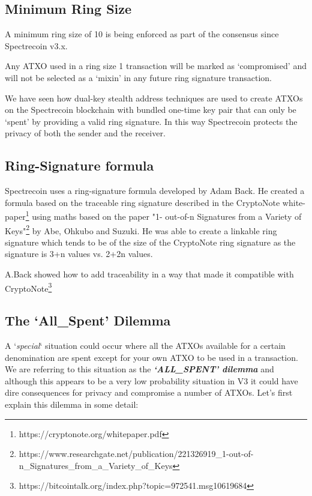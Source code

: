 \subsection{Minimum Ring Size}

A minimum ring size of 10 is being enforced as part of the consensus since Spectrecoin v3.x.



Any ATXO used in a ring size 1 transaction will be marked as ‘compromised’ and will not be selected as a
‘mixin’ in any future ring signature transaction.



We have seen how dual-key stealth address techniques are used to create ATXOs on the Spectrecoin
blockchain with bundled one-time key pair that can only be ‘spent’ by providing a valid ring signature.
In this way Spectrecoin protects the privacy of both the sender and the receiver.



\subsection{Ring-Signature formula}
Spectrecoin uses a ring-signature formula developed by Adam Back. He created a formula based on the
traceable ring signature described in the CryptoNote white-paper\footnote{https://cryptonote.org/whitepaper.pdf} using maths based on the paper "1-
out-of-n Signatures from a Variety of Keys"\footnote{https://www.researchgate.net/publication/221326919\_1-out-of-n\_Signatures\_from\_a\_Variety\_of\_Keys} by Abe, Ohkubo and Suzuki. He was able to create a linkable ring signature which tends to be  of the size of the CryptoNote ring signature as the signature is 3+n
values vs. 2+2n values.



A.Back showed how to add traceability in a way that made it compatible with CryptoNote\footnote{https://bitcointalk.org/index.php?topic=972541.msg10619684}

\vspace{5mm} %



\vspace{5mm} %



\subsection{The ‘All\_Spent’ Dilemma}
A ‘\textit{special}‘ situation could occur where all the ATXOs available for a
certain denomination are spent except for your own ATXO to be used in a transaction.
We are referring to this situation as the \textbf{\textit{‘ALL\_SPENT’ dilemma}}
and although this appears to be a very low probability situation in V3 it could
have dire consequences for privacy and compromise a number of ATXOs. Let’s first
explain this dilemma in some detail:



